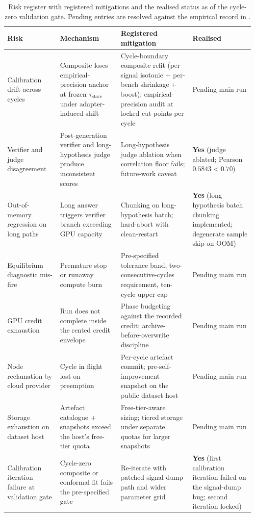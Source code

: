 \begin{table}[!htbp]
\centering
\footnotesize
\begin{tabular}{@{}p{3.6cm}p{4.6cm}p{4.6cm}p{2.0cm}@{}}
\toprule
\textbf{Risk} & \textbf{Mechanism} & \textbf{Registered mitigation} & \textbf{Realised} \\
\midrule
Calibration drift across cycles & Composite loses empirical-precision anchor at frozen $\tau_{\text{store}}$ under adapter-induced shift & Cycle-boundary composite refit (per-signal isotonic + per-bench shrinkage + boost); empirical-precision audit at locked cut-points per cycle & Pending main run \\
Verifier and judge disagreement & Post-generation verifier and long-hypothesis judge produce inconsistent scores & Long-hypothesis judge ablation when correlation floor fails; future-work caveat & \textbf{Yes} (judge ablated; Pearson $0.5843<0.70$) \\
Out-of-memory regression on long paths & Long answer triggers verifier branch exceeding GPU capacity & Chunking on long-hypothesis batch; hard-abort with clean-restart & \textbf{Yes} (long-hypothesis batch chunking implemented; degenerate sample skip on OOM) \\
Equilibrium diagnostic mis-fire & Premature stop or runaway compute burn & Pre-specified tolerance band, two-consecutive-cycles requirement, ten-cycle upper cap & Pending main run \\
GPU credit exhaustion & Run does not complete inside the rented credit envelope & Phase budgeting against the recorded credit; archive-before-overwrite discipline & Pending main run \\
Node reclamation by cloud provider & Cycle in flight lost on preemption & Per-cycle artefact commit; pre-self-improvement snapshot on the public dataset host & Pending main run \\
Storage exhaustion on dataset host & Artefact catalogue $+$ snapshots exceed the host's free-tier quota & Free-tier-aware sizing; tiered storage under separate quotas for larger snapshots & Pending main run \\
Calibration iteration failure at validation gate & Cycle-zero composite or conformal fit fails the pre-specified gate & Re-iterate with patched signal-dump path and wider parameter grid & \textbf{Yes} (first calibration iteration failed on the signal-dump bug; second iteration locked) \\
\bottomrule
\end{tabular}
\caption[Risk register with registered mitigations and the realised status as of the cycle-zero validation gate.]{Risk register with registered mitigations and the realised status as of the cycle-zero validation gate. Pending entries are resolved against the empirical record in .}
\label{tab:risk-register}
\end{table}


